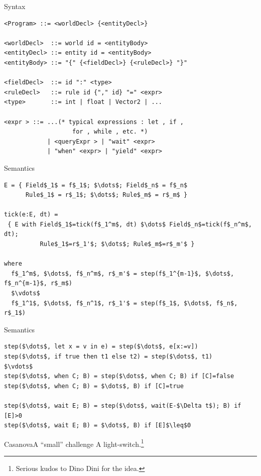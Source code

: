 \documentclass{beamer}
\begin{document}
\begin{frame}[fragile]{Syntax}
\begin{lstlisting}[frame=shadowbox]
<Program> ::= <worldDecl> {<entityDecl>}

<worldDecl>  ::= world id = <entityBody>
<entityDecl> ::= entity id = <entityBody>
<entityBody> ::= "{" {<fieldDecl>} {<ruleDecl>} "}"

<fieldDecl>  ::= id ":" <type>
<ruleDecl>   ::= rule id {"," id} "=" <expr>
<type>       ::= int | float | Vector2 | ...

<expr > ::= ...(* typical expressions : let , if , 
                   for , while , etc. *)
            | <queryExpr > | "wait" <expr> 
            | "when" <expr> | "yield" <expr>
\end{lstlisting}
\end{frame}

\begin{frame}[fragile]{Semantics}
\begin{lstlisting}[frame=shadowbox]
E = { Field$_1$ = f$_1$; $\dots$; Field$_n$ = f$_n$
      Rule$_1$ = r$_1$; $\dots$; Rule$_m$ = r$_m$ }

tick(e:E, dt) = 
 { E with Field$_1$=tick(f$_1^m$, dt) $\dots$ Field$_n$=tick(f$_n^m$, dt); 
          Rule$_1$=r$_1'$; $\dots$; Rule$_m$=r$_m'$ }
           
where
  f$_1^m$, $\dots$, f$_n^m$, r$_m'$ = step(f$_1^{m-1}$, $\dots$, f$_n^{m-1}$, r$_m$)
  $\vdots$
  f$_1^1$, $\dots$, f$_n^1$, r$_1'$ = step(f$_1$, $\dots$, f$_n$, r$_1$)  
\end{lstlisting}
\end{frame}

\begin{frame}[fragile]{Semantics}
\begin{lstlisting}[frame=shadowbox]
step($\dots$, let x = v in e) = step($\dots$, e[x:=v])
step($\dots$, if true then t1 else t2) = step($\dots$, t1)
$\vdots$
step($\dots$, when C; B) = step($\dots$, when C; B) if [C]=false 
step($\dots$, when C; B) = $\dots$, B) if [C]=true

step($\dots$, wait E; B) = step($\dots$, wait(E-$\Delta t$); B) if [E]>0
step($\dots$, wait E; B) = $\dots$, B) if [E]$\leq$0
\end{lstlisting}
\end{frame}


\begin{textslide}{Casanova}{A ``small'' challenge}{
A light-switch.\footnote{Serious kudos to Dino Dini for the idea.}
}\end{textslide}
\end{document}
